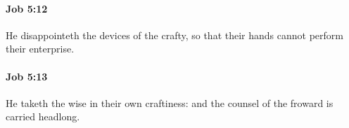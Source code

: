 		\paragraph{Job 5:12} %
			\label{JOB-5-12}

			He disappointeth the devices of the crafty, so that their hands cannot perform their enterprise.


		\paragraph{Job 5:13} %
			\label{JOB-5-13}

			He taketh the wise in their own craftiness: and the counsel of the froward is carried headlong.


